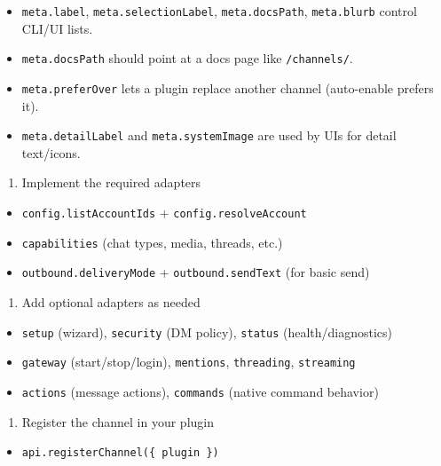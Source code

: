 \begin{itemize}
  \item \texttt{meta.label}, \texttt{meta.selectionLabel}, \texttt{meta.docsPath}, \texttt{meta.blurb} control CLI/UI lists.
  \item \texttt{meta.docsPath} should point at a docs page like \texttt{/channels/}.
  \item \texttt{meta.preferOver} lets a plugin replace another channel (auto-enable prefers it).
  \item \texttt{meta.detailLabel} and \texttt{meta.systemImage} are used by UIs for detail text/icons.
\end{itemize}


\begin{enumerate}
  \item Implement the required adapters
\end{enumerate}


\begin{itemize}
  \item \texttt{config.listAccountIds} + \texttt{config.resolveAccount}
  \item \texttt{capabilities} (chat types, media, threads, etc.)
  \item \texttt{outbound.deliveryMode} + \texttt{outbound.sendText} (for basic send)
\end{itemize}


\begin{enumerate}
  \item Add optional adapters as needed
\end{enumerate}


\begin{itemize}
  \item \texttt{setup} (wizard), \texttt{security} (DM policy), \texttt{status} (health/diagnostics)
  \item \texttt{gateway} (start/stop/login), \texttt{mentions}, \texttt{threading}, \texttt{streaming}
  \item \texttt{actions} (message actions), \texttt{commands} (native command behavior)
\end{itemize}


\begin{enumerate}
  \item Register the channel in your plugin
\end{enumerate}


\begin{itemize}
  \item \texttt{api.registerChannel(\{ plugin \})}
\end{itemize}


